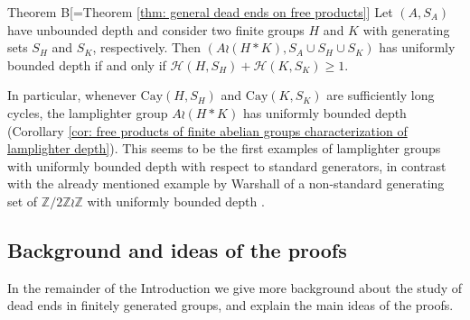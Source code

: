 \documentclass[reqno,oneside]{amsart}
\newcommand{\cay}[2]{\mathrm{Cay}(#1,#2)}
\newcommand{\Z}{\mathbb{Z}}
\newcommand{\thistheoremname}{}
\newtheorem*{genericthm*}{\thistheoremname}
\newenvironment{namedthm*}[1]
{\renewcommand{\thistheoremname}{#1}%
	\begin{genericthm*}}
	{\end{genericthm*}}
\theoremstyle{plain}
\theoremstyle{definition}
\begin{document}
\begin{namedthm*}{Theorem B}[\;=\;Theorem \ref{thm: general dead ends on free products}]\label{thm: Theorem B}
	Let $(A,S_A)$ have unbounded depth and consider two finite groups $H$ and $K$ with generating sets $S_H$ and $S_K$, respectively. Then $(A\wr (H*K),S_A\cup S_H\cup S_K)$ has uniformly bounded depth if and only if $\mathscr{H}(H,S_H)+\mathscr{H}(K,S_K)\ge 1$.
\end{namedthm*}
In particular, whenever $\cay{H}{S_H}$ and $\cay{K}{S_K}$ are sufficiently long cycles, the lamplighter group $A\wr (H*K)$ has uniformly bounded depth (Corollary \ref{cor: free products of finite abelian groups characterization of lamplighter depth}). This seems to be the first examples of lamplighter groups with uniformly bounded depth with respect to standard generators, in contrast with the already mentioned example by Warshall of a non-standard generating set of $\Z/2\Z\wr\Z$ with uniformly bounded depth \cite{warshall2008strongly}.

\subsection{Background and ideas of the proofs}
In the remainder of the Introduction we give more background about the study of dead ends in finitely generated groups, and explain the main ideas of the proofs.
\end{document}
